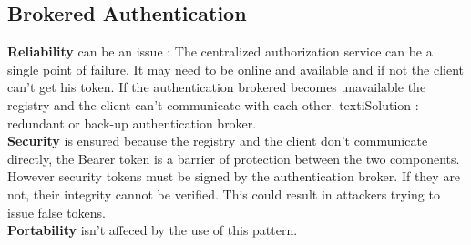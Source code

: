 \subsection{Brokered Authentication}
\textbf{Reliability} can be an issue :
The centralized authorization service can be a single point of failure. It may need to be online and available and if not the client can't get his token. If the authentication brokered becomes unavailable the registry and the client can't communicate with each other.
texti{Solution :} redundant or back-up authentication broker. \\
\textbf{Security} is ensured because the registry and the client don't communicate directly, the Bearer token is a barrier of protection between the two components.\\
However security tokens must be signed by the authentication broker. If they are not, their integrity cannot be verified. This could result in attackers trying to issue false tokens. \\
\textbf{Portability} isn't affeced by the use of this pattern. \\
